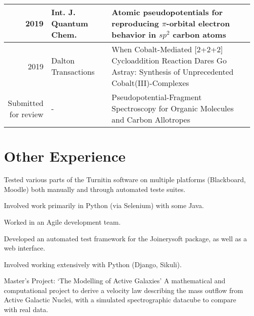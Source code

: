\documentclass[letterpaper]{deedy-resume} %
\begin{document}
\begin{minipage}[t]{0.66\textwidth}
\begin{tabular}{rlm{7cm}}
2019 & Int. J. Quantum Chem. & Atomic pseudopotentials for reproducing $\pi$-orbital electron behavior in $sp^2$ carbon atoms \\
\hline
2019 & Dalton Transactions & When Cobalt-Mediated [2+2+2] Cycloaddition Reaction Dares Go Astray: Synthesis of Unprecedented  Cobalt(III)-Complexes \\
\hline
\makecell{Submitted \\ for review} & - & Pseudopotential-Fragment Spectroscopy for Organic Molecules and Carbon Allotropes
\end{tabular}

\sectionspace %


\section{Other Experience}


\begin{tightitemize}
\item Tested various parts of the Turnitin software on multiple platforms (Blackboard, Moodle) both manually and through automated teste suites.
\item Involved work primarily in Python (via Selenium) with some Java.
\item Worked in an Agile development team.
\end{tightitemize}

\sectionspace %




\begin{tightitemize}
\item Developed an automated test framework for the Joinerysoft package, as well as a web interface.
\item Involved working extensively with Python (Django, Sikuli).
\end{tightitemize}

\sectionspace %



\begin{tightitemize}
\item Master's Project: `The Modelling of Active Galaxies' A mathematical and computational project to derive a velocity law describing the mass outflow from Active Galactic Nuclei, with a simulated spectrographic datacube to compare with real data.
\end{tightitemize}

\end{minipage}
\end{document}
